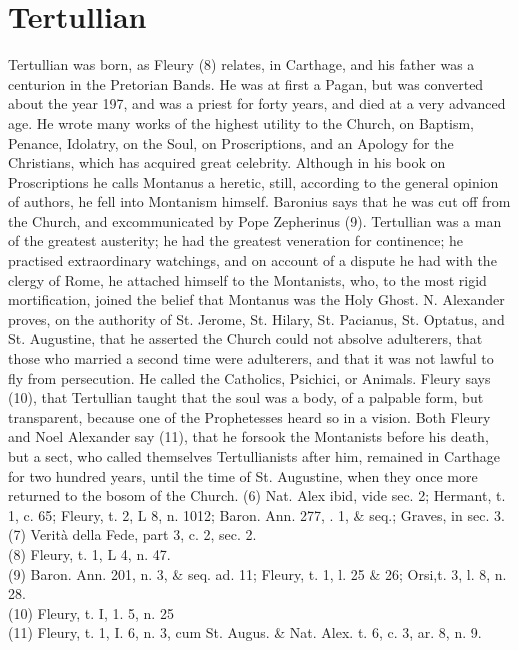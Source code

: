 \documentclass[12pt]{book}
\begin{document}
\section{Tertullian}
Tertullian was born, as Fleury (8) relates, in Carthage, and his father was a centurion in the Pretorian
Bands. He was at first a Pagan, but was converted about the year 197, and was a priest for forty years,
and died at a very advanced age. He wrote many works of the highest utility to the Church, on Baptism,
Penance, Idolatry, on the Soul, on Proscriptions, and an Apology for the Christians, which has acquired
great celebrity. Although in his book on Proscriptions he calls Montanus a heretic, still, according to the
general opinion of authors, he fell into Montanism himself. Baronius says that he was cut off from the
Church, and excommunicated by Pope Zepherinus (9). Tertullian was a man of the greatest austerity; he
had the greatest veneration for continence; he practised extraordinary watchings, and on account of a
dispute he had with the clergy of Rome, he attached himself to the Montanists, who, to the most rigid
mortification, joined the belief that Montanus was the Holy Ghost. N. Alexander proves, on the authority
of St. Jerome, St. Hilary, St. Pacianus, St. Optatus, and St. Augustine, that he asserted the Church could
not absolve adulterers, that those who married a second time were adulterers, and that it was not lawful
to fly from persecution. He called the Catholics, Psichici, or Animals. Fleury says (10), that Tertullian
taught that the soul was a body, of a palpable form, but transparent, because one of the Prophetesses
heard so in a vision. Both Fleury and Noel Alexander say (11), that he forsook the Montanists before his
death, but a sect, who called themselves Tertullianists after him, remained in Carthage for two hundred
years, until the time of St. Augustine, when they once more returned to the bosom of the Church.
(6) Nat. Alex ibid, vide sec. 2; Hermant, t. 1, c. 65; Fleury, t. 2, L 8, n. 1012; Baron. Ann. 277, . 1, \& seq.;
Graves, in sec. 3.\\
(7) Verità della Fede, part 3, c. 2, sec. 2.\\
(8) Fleury, t. 1, L 4, n. 47.\\
(9) Baron. Ann. 201, n. 3, \& seq. ad. 11; Fleury, t. 1, l. 25 \& 26; Orsi,t. 3, l. 8, n. 28.\\
(10) Fleury, t. I, 1. 5, n. 25\\
(11) Fleury, t. 1, I. 6, n. 3, cum St. Augus. \& Nat. Alex. t. 6, c. 3, ar. 8, n. 9.
\end{document}
